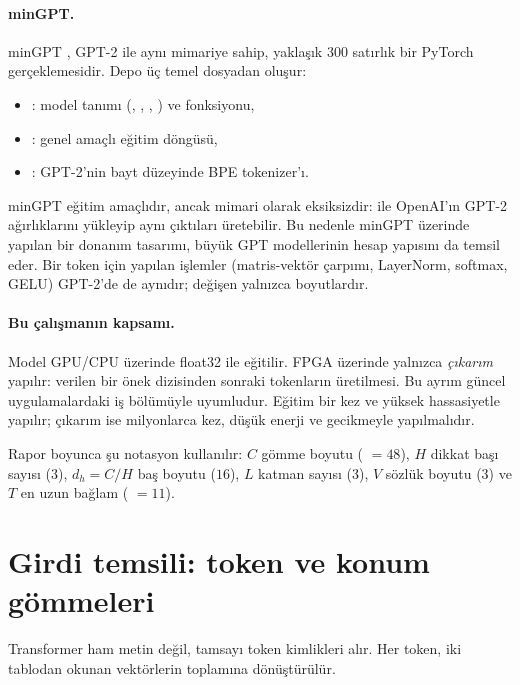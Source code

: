 \paragraph{minGPT.} minGPT \cite{mingpt}, GPT-2 ile aynı mimariye sahip, yaklaşık 300 satırlık bir PyTorch gerçeklemesidir. Depo üç temel dosyadan oluşur:
\begin{itemize}
  \item {}: model tanımı (, , , ) ve  fonksiyonu,
  \item {}: genel amaçlı eğitim döngüsü,
  \item {}: GPT-2'nin bayt düzeyinde BPE tokenizer'ı.
\end{itemize}
minGPT eğitim amaçlıdır, ancak mimari olarak eksiksizdir:  ile OpenAI'ın GPT-2 ağırlıklarını yükleyip aynı çıktıları üretebilir. Bu nedenle minGPT üzerinde yapılan bir donanım tasarımı, büyük GPT modellerinin hesap yapısını da temsil eder. Bir token için yapılan işlemler (matris-vektör çarpımı, LayerNorm, softmax, GELU) GPT-2'de de aynıdır; değişen yalnızca boyutlardır.

\paragraph{Bu çalışmanın kapsamı.} Model GPU/CPU üzerinde float32 ile eğitilir. FPGA üzerinde yalnızca \emph{çıkarım} yapılır: verilen bir önek dizisinden sonraki tokenların üretilmesi. Bu ayrım güncel uygulamalardaki iş bölümüyle uyumludur. Eğitim bir kez ve yüksek hassasiyetle yapılır; çıkarım ise milyonlarca kez, düşük enerji ve gecikmeyle yapılmalıdır.

Rapor boyunca şu notasyon kullanılır: $C$ gömme boyutu ( $=48$), $H$ dikkat başı sayısı ($3$), $d_h = C/H$ baş boyutu ($16$), $L$ katman sayısı ($3$), $V$ sözlük boyutu ($3$) ve $T$ en uzun bağlam ( $=11$).

\section{Girdi temsili: token ve konum gömmeleri}

Transformer ham metin değil, tamsayı token kimlikleri alır. Her token, iki tablodan okunan vektörlerin toplamına dönüştürülür.

